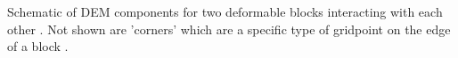 \label{fig:dem} Schematic of DEM components for two deformable blocks interacting with each other \cite{itasca_udec_2011}. Not shown are 'corners' which are a specific type of gridpoint on the edge of a block .
